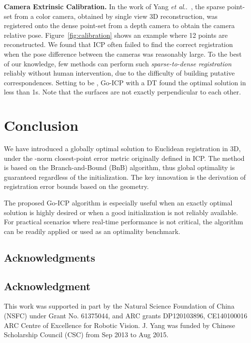 \documentclass[10pt,journal,cspaper,compsoc]{IEEEtran}
\makeatletter
\DeclareRobustCommand\onedot{\futurelet\@let@token\@onedot}
\def\@onedot{\ifx\@let@token.\else.\null\fi\xspace}
\def\etal{\emph{et al}\onedot}
\makeatother
\begin{document}
\vspace{0.06in}
\noindent\textbf{Camera Extrinsic Calibration.}
In the work of Yang \etal~\cite{yang2013single}, the sparse point-set from a color camera, obtained by single view 3D reconstruction, was registered onto the dense point-set from a depth camera to obtain the camera relative pose. Figure~\ref{fig:calibration} shows an example where 12 points are reconstructed. We found that ICP often failed to find the correct registration when the pose difference between the cameras was reasonably large. To the best of our knowledge, few methods can perform such \emph{sparse-to-dense registration} reliably without human intervention, due to the difficulty of building putative correspondences.
Setting  to be , Go-ICP with a DT found the optimal solution in less than 1s. Note that the surfaces are not exactly perpendicular to each other.

\section{Conclusion}\label{sec:conclusion}
We have introduced a globally optimal solution to Euclidean registration in 3D, under the -norm closest-point error metric originally defined in ICP. The method is based on the Branch-and-Bound (BnB) algorithm, thus global optimality is guaranteed regardless of the initialization. The key innovation is the derivation of registration error bounds based on the  geometry.

The proposed Go-ICP algorithm is especially useful when an exactly optimal solution is highly desired or when a good initialization is not reliably available. For practical scenarios where real-time performance is not critical, the algorithm can be readily applied or used as an optimality benchmark.

\vspace{-5pt}
\ifCLASSOPTIONcompsoc
\subsection*{Acknowledgments}
\else
\subsection*{Acknowledgment}
\fi
{
This work was supported in part by the Natural Science Foundation of China (NSFC) under Grant No. 61375044, and ARC grants DP120103896, CE140100016 ARC Centre of Excellence for Robotic Vision. J. Yang was funded by Chinese Scholarship Council (CSC) from Sep 2013 to Aug 2015.
}
\end{document}
